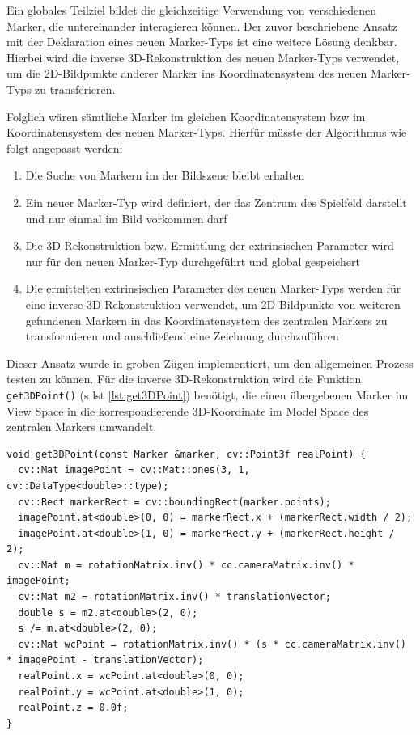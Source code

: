 Ein globales Teilziel bildet die gleichzeitige Verwendung von verschiedenen Marker, die untereinander interagieren können. Der zuvor beschriebene Ansatz mit der Deklaration eines neuen Marker-Typs ist eine weitere Lösung denkbar. Hierbei wird die inverse 3D-Rekonstruktion des neuen Marker-Typs verwendet, um die 2D-Bildpunkte anderer Marker ins Koordinatensystem des neuen Marker-Typs zu transferieren. 

\newpage

Folglich wären sämtliche Marker im gleichen Koordinatensystem \acs{bzw} im Koordinatensystem des neuen Marker-Typs. Hierfür müsste der Algorithmus wie folgt angepasst werden:

\begin{enumerate}
\item Die Suche von Markern im der Bildszene bleibt erhalten
\item Ein neuer Marker-Typ wird definiert, der das Zentrum des Spielfeld darstellt und nur einmal im Bild vorkommen darf
\item Die 3D-Rekonstruktion bzw. Ermittlung der extrinsischen Parameter wird nur für den neuen Marker-Typ durchgeführt und global gespeichert
\item Die ermittelten extrinsischen Parameter des neuen Marker-Typs werden für eine inverse 3D-Rekonstruktion verwendet, um 2D-Bildpunkte von weiteren gefundenen Markern in das Koordinatensystem des zentralen Markers zu transformieren und anschließend eine Zeichnung durchzuführen
\end{enumerate}

\noindent Dieser Ansatz wurde in groben Zügen implementiert, um den allgemeinen Prozess testen zu können. Für die inverse 3D-Rekonstruktion wird die Funktion \texttt{get3DPoint()} (\acs{s} \acs{lst} \ref{lst:get3DPoint}) benötigt, die einen übergebenen Marker im View Space in die korrespondierende 3D-Koordinate im Model Space des zentralen Markers umwandelt. 

\begin{lstlisting}[caption={Die Funktion \texttt{get3DPoint()}, die einen übergebenen Marker im View Space mittels einer inversen Transformation in den Model Space des zentralen Markers transformiert und nicht Bestandteil des Projektquellcodes ist}, label={lst:get3DPoint}]
void get3DPoint(const Marker &marker, cv::Point3f realPoint) {
  cv::Mat imagePoint = cv::Mat::ones(3, 1, cv::DataType<double>::type);
  cv::Rect markerRect = cv::boundingRect(marker.points);
  imagePoint.at<double>(0, 0) = markerRect.x + (markerRect.width / 2);
  imagePoint.at<double>(1, 0) = markerRect.y + (markerRect.height / 2);
  cv::Mat m = rotationMatrix.inv() * cc.cameraMatrix.inv() * imagePoint;
  cv::Mat m2 = rotationMatrix.inv() * translationVector;
  double s = m2.at<double>(2, 0);
  s /= m.at<double>(2, 0);
  cv::Mat wcPoint = rotationMatrix.inv() * (s * cc.cameraMatrix.inv() * imagePoint - translationVector);
  realPoint.x = wcPoint.at<double>(0, 0);
  realPoint.y = wcPoint.at<double>(1, 0);
  realPoint.z = 0.0f;
}
\end{lstlisting}

